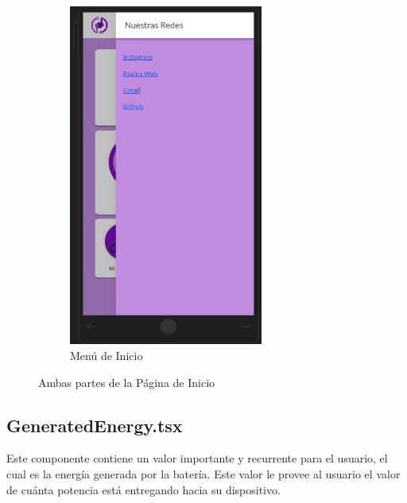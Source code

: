 \begin{figure} [H]
\begin{subfigure}{0.4\textwidth}
                        \includegraphics[width=0.7\textwidth]{Aplicación/Start_Menu.png}
                        \caption{Menú de Inicio}
                        \label{fig:a2.2}
                    \end{subfigure}
                    \hfill
                            
                    \caption{Ambas partes de la Página de Inicio}
                    \label{fig:a2}
                    \end{figure}
                
            \subsection{GeneratedEnergy.tsx}
                Este componente contiene un valor importante y recurrente para el usuario, el cual es la energía generada por la batería. Este valor le provee al usuario el valor de cuánta potencia está entregando hacia su dispositivo.\par

